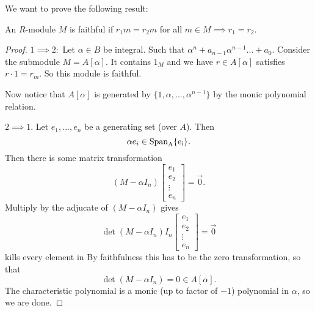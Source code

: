 

We want to prove the following result:
\begin{remark}
    An $R$-module $M$ is faithful if $r_1m=r_2m$ for all $m\in M\implies r_1=r_2$.  
\end{remark}

\begin{proof}
    $1\implies 2:$ Let $\alpha\in B$ be integral. Such that $\alpha^n + a_{n-1}\alpha^{n-1}... +a_0$. Consider the submodule $M=A[\alpha]$. It contains $1_M$ and we have $r\in A[\alpha]$ satisfies $r\cdot 1=r_m$. So this module is faithful.

    Now notice that $A[\alpha]$ is generated by $\{1,\alpha,...,\alpha^{n-1}\}$ by the monic polynomial relation.

    $2\implies 1$. Let $e_1,...,e_n$ be a generating set (over $A$). Then \[
        \alpha e_i \in \rm{Span}_A \{e_i\}.
    \]
    Then there is some matrix transformation \[
    (M-\alpha I_n)\begin{bmatrix}
        e_1 \\ e_2 \\ \vdots \\ e_n
    \end{bmatrix}=\vec{0}.
    \]
    Multiply by the adjucate of $(M-\alpha I_n)$ gives \[
    \det (M-\alpha I_n) I_n \begin{bmatrix}
        e_1 \\ e_2 \\ \vdots \\ e_n
    \end{bmatrix} =\vec{0}
    \]
    kills every element in 
    By faithfulness this has to be the zero transformation, so that \[
    \det (M-\alpha I_n) = 0 \in A[\alpha].
    \]
    The characteristic polynomial is a monic (up to factor of $-1$) polynomial in $\alpha$, so we are done.

\end{proof}